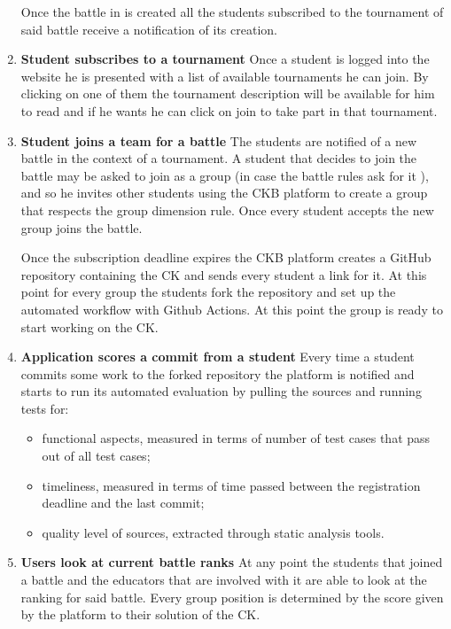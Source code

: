 \begin{enumerate}
    Once the battle in is created all the students subscribed to the tournament of said battle receive a notification of its creation.
    
    \item \textbf{Student subscribes to a tournament}\newline
    Once a student is logged into the website he is presented with a list of available tournaments he can join. By clicking on one of them the tournament description will be available for him to read and if he wants he can click on join to take part in that tournament.
    
    \item \textbf{Student joins a team for a battle}\newline
    The students are notified of a new battle in the context of a tournament.
    A student that decides to join the battle may be asked to join as a group (in case the battle rules ask for it ), and so he invites other students using the \ac{CKB} platform to create a group that respects the group dimension rule.  
    Once every student accepts the new group joins the battle.   
    
    Once the subscription deadline expires the \ac{CKB} platform creates a GitHub repository containing the \ac{CK} and sends every student a link for it.  
    At this point for every group the students fork the repository and set up the automated workflow with Github Actions.
    At this point the group is ready to start working on the \ac{CK}.
    
    
    \item \textbf{Application scores a commit from a student}\newline
    Every time a student commits some work to the forked repository the platform is notified and starts to run its automated evaluation by pulling the sources and running tests for:
    \begin{itemize}
        \item functional aspects, measured in terms of number of test cases that pass out of all test cases;
        \item timeliness, measured in terms of time passed between the registration deadline and the last commit;
        \item quality level of sources, extracted through static analysis tools.
    \end{itemize}
    
    \item \textbf{Users look at current battle ranks}\newline
    At any point the students that joined a battle and the educators that are involved with it are able to look at the ranking for said battle. Every group position is determined by the score given by the platform to their solution of the \ac{CK}.
    

\end{enumerate}
